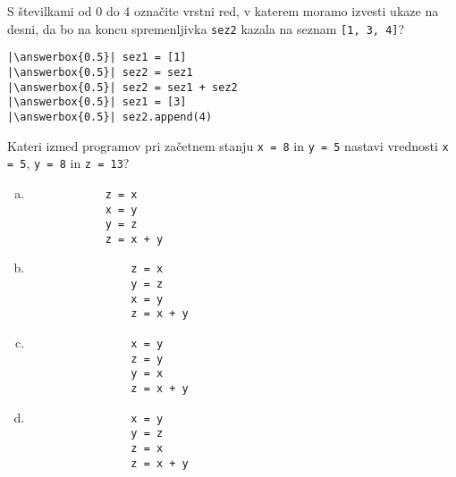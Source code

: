 \documentclass[arhiv, 10pt]{../izpit}
\newcommand{\inlinepy}[1]{\texttt{#1}}
\newcommand{\answerbox}[1]{\framebox{\vphantom{\large M}\hspace{#1cm}}}
\begin{document}
        \naloga*
        \begin{multicols}{2}
        \noindent 
        S številkami od $0$ do $4$ označite vrstni red, v katerem moramo izvesti ukaze na desni, da bo na koncu spremenljivka \inlinepy{sez2} kazala na seznam \inlinepy{[1, 3, 4]}?
    
        \columnbreak
        \noindent
        \begin{verbatim}
|\answerbox{0.5}| sez1 = [1]
|\answerbox{0.5}| sez2 = sez1
|\answerbox{0.5}| sez2 = sez1 + sez2
|\answerbox{0.5}| sez1 = [3]
|\answerbox{0.5}| sez2.append(4)

        \end{verbatim}
        \end{multicols}
    
            
        \naloga*
        
        Kateri izmed programov pri začetnem stanju
            \inlinepy{x = 8} in
            \inlinepy{y = 5}
        nastavi vrednosti
            \inlinepy{x = 5},
            \inlinepy{y = 8} in
            \inlinepy{z = 13}?
    
        \begin{multicols}{4}
        \begin{enumerate}[(a)]
\item 
            \begin{verbatim}
            z = x
            x = y
            y = z
            z = x + y
            \end{verbatim}
        
\item 
                \begin{verbatim}
                z = x
                y = z
                x = y
                z = x + y
                \end{verbatim}
            
\item 
                \begin{verbatim}
                x = y
                z = y
                y = x
                z = x + y
                \end{verbatim}
            
\item 
                \begin{verbatim}
                x = y
                y = z
                z = x
                z = x + y
                \end{verbatim}
            
\end{enumerate}

        \end{multicols}
    
\end{document}
